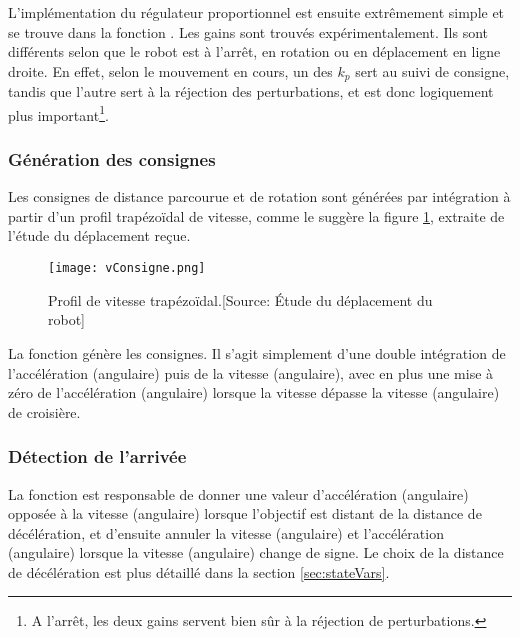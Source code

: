 L'implémentation du régulateur proportionnel est ensuite extrêmement simple et se trouve dans la fonction . Les gains sont trouvés expérimentalement. Ils sont différents selon que le robot est à l'arrêt, en rotation ou en déplacement en ligne droite. En effet, selon le mouvement en cours, un des $k_p$ sert au suivi de consigne, tandis que l'autre sert à la réjection des perturbations, et est donc logiquement plus important\footnote{A l'arrêt, les deux gains servent bien sûr à la réjection de perturbations.}.

\subsubsection{Génération des consignes}
Les consignes de distance parcourue et de rotation sont générées par intégration à partir d'un profil trapézoïdal de vitesse, comme le suggère la figure \ref{fig:vConsigne}, extraite de l'étude du déplacement reçue.
\begin{figure}[htbp]
  \centering
  \texttt{[image: vConsigne.png]}
  \caption{Profil de vitesse trapézoïdal.[Source: \'Etude du déplacement du robot]\label{fig:vConsigne}}
\end{figure}
La fonction  génère les consignes. Il s'agit simplement d'une double intégration de l'accélération (angulaire) puis de la vitesse (angulaire), avec en plus une mise à zéro de l'accélération (angulaire) lorsque la vitesse dépasse la vitesse (angulaire) de croisière.

\subsubsection{Détection de l'arrivée}
La fonction  est responsable de donner une valeur d'accélération (angulaire) opposée à la vitesse (angulaire) lorsque l'objectif est distant de la distance de décélération, et d'ensuite annuler la vitesse (angulaire) et l'accélération (angulaire) lorsque la vitesse (angulaire) change de signe. Le choix de la distance de décélération est plus détaillé dans la section \ref{sec:stateVars}.

